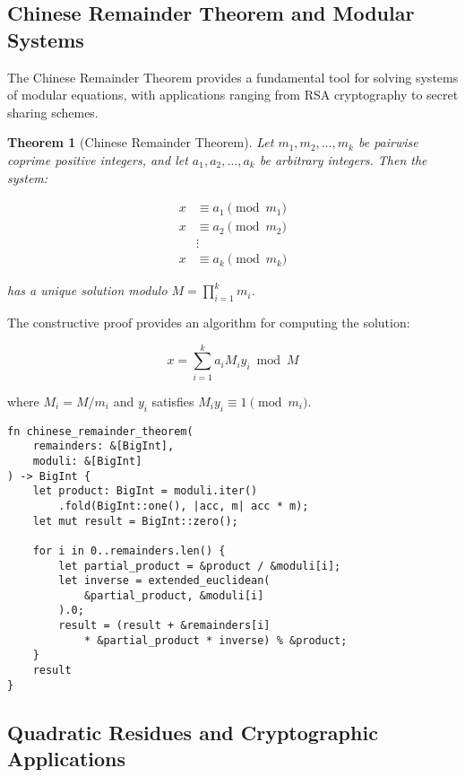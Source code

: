 \documentclass[12pt,a4paper]{article}
\newtheorem{theorem}{Theorem}[section]
\begin{document}
\subsection{Chinese Remainder Theorem and Modular Systems}

The Chinese Remainder Theorem provides a fundamental tool for solving systems of modular equations, with applications ranging from RSA cryptography to secret sharing schemes.

\begin{theorem}[Chinese Remainder Theorem]
Let $m_1, m_2, \ldots, m_k$ be pairwise coprime positive integers, and let $a_1, a_2, \ldots, a_k$ be arbitrary integers. Then the system:

\begin{align}
x &\equiv a_1 \pmod{m_1} \\
x &\equiv a_2 \pmod{m_2} \\
&\vdots \\
x &\equiv a_k \pmod{m_k}
\end{align}

has a unique solution modulo $M = \prod_{i=1}^k m_i$.
\end{theorem}

The constructive proof provides an algorithm for computing the solution:

\begin{equation}
x = \sum_{i=1}^k a_i M_i y_i \bmod M
\end{equation}

where $M_i = M/m_i$ and $y_i$ satisfies $M_i y_i \equiv 1 \pmod{m_i}$.

\begin{lstlisting}[caption={Chinese Remainder Theorem Implementation}]
fn chinese_remainder_theorem(
    remainders: &[BigInt], 
    moduli: &[BigInt]
) -> BigInt {
    let product: BigInt = moduli.iter()
        .fold(BigInt::one(), |acc, m| acc * m);
    let mut result = BigInt::zero();

    for i in 0..remainders.len() {
        let partial_product = &product / &moduli[i];
        let inverse = extended_euclidean(
            &partial_product, &moduli[i]
        ).0;
        result = (result + &remainders[i] 
            * &partial_product * inverse) % &product;
    }
    result
}
\end{lstlisting}

\subsection{Quadratic Residues and Cryptographic Applications}
\end{document}
